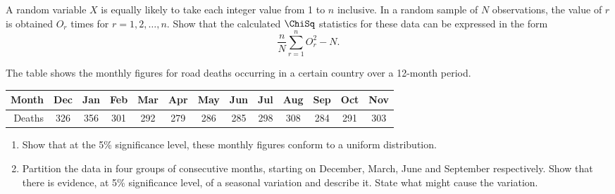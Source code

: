 \begin{problem}
    A random variable $X$ is equally likely to take each integer value from 1 to $n$ inclusive. In a random sample of $N$ observations, the value of $r$ is obtained $O_r$ times for $r = 1, 2, \dots, n$. Show that the calculated $\ChiSq$ statistics for these data can be expressed in the form \[\frac{n}{N} \sum_{r = 1}^n O_r^2 - N.\]

    The table shows the monthly figures for road deaths occurring in a certain country over a 12-month period.

    \begin{table}[H]
        \centering
        \begin{tabular}{|r|c|c|c|c|c|c|c|c|c|c|c|c|}
        \hline
        Month & Dec & Jan & Feb & Mar & Apr & May & Jun & Jul & Aug & Sep & Oct & Nov \\ \hline
        Deaths & 326 & 356 & 301 & 292 & 279 & 286 & 285 & 298 & 308 & 284 & 291 & 303 \\ \hline
        \end{tabular}
    \end{table}

    \begin{enumerate}
        \item Show that at the 5\% significance level, these monthly figures conform to a uniform distribution.
        \item Partition the data in four groups of consecutive months, starting on December, March, June and September respectively. Show that there is evidence, at 5\% significance level, of a seasonal variation and describe it. State what might cause the variation.
    \end{enumerate}
\end{problem}
